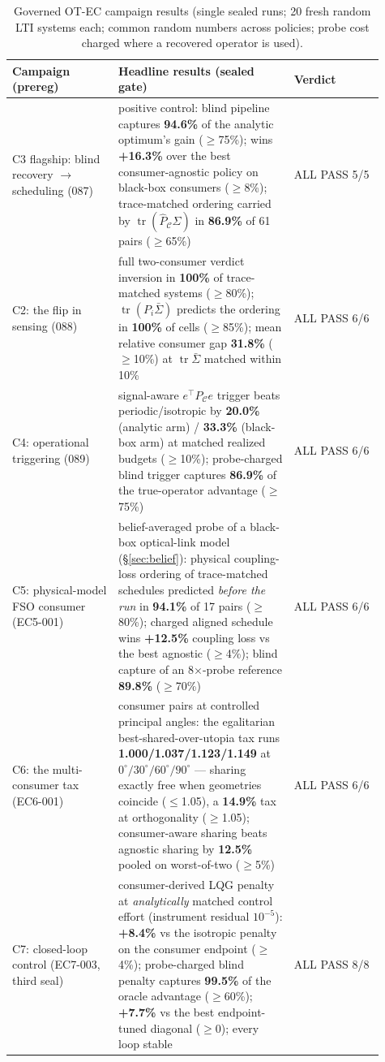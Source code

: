 \documentclass{article}
\theoremstyle{definition}
\theoremstyle{remark}
\newcommand{\PC}{P_{\mathcal{C}}}
\newcommand{\tr}{\operatorname{tr}}
\newcommand{\Sig}{\Sigma}
\begin{document}
\begin{table}[t]
\caption{Governed OT-EC campaign results (single sealed runs; 20 fresh
random LTI systems each; common random numbers across policies; probe cost
charged where a recovered operator is used).}
\label{tab:evidence}
\centering
\begin{tabular}{@{}p{0.26\linewidth}p{0.43\linewidth}p{0.22\linewidth}@{}}
\toprule
\textbf{Campaign (prereg)} & \textbf{Headline results (sealed gate)} & \textbf{Verdict} \\
\midrule
C3 flagship: blind recovery $\to$ scheduling (087) &
positive control: blind pipeline captures \textbf{94.6\%} of the analytic
optimum's gain ($\ge$75\%); wins \textbf{+16.3\%} over the best
consumer-agnostic policy on black-box consumers ($\ge$8\%); trace-matched
ordering carried by $\tr(\widehat\PC\Sig)$ in \textbf{86.9\%} of 61 pairs
($\ge$65\%) & ALL PASS 5/5 \\
\addlinespace
C2: the flip in sensing (088) &
full two-consumer verdict inversion in \textbf{100\%} of trace-matched
systems ($\ge$80\%); $\tr(P_i\bar\Sig)$ predicts the ordering in
\textbf{100\%} of cells ($\ge$85\%); mean relative consumer gap
\textbf{31.8\%} ($\ge$10\%) at $\tr\bar\Sig$ matched within 10\% & ALL PASS 6/6 \\
\addlinespace
C4: operational triggering (089) &
signal-aware $e^{\top}\PC e$ trigger beats periodic/isotropic by
\textbf{20.0\%} (analytic arm) / \textbf{33.3\%} (black-box arm) at matched
realized budgets ($\ge$10\%); probe-charged blind trigger captures
\textbf{86.9\%} of the true-operator advantage ($\ge$75\%) & ALL PASS 6/6 \\
\addlinespace
C5: physical-model FSO consumer (EC5-001) &
belief-averaged probe of a black-box optical-link model
(\S\ref{sec:belief}): physical coupling-loss ordering of trace-matched
schedules predicted \emph{before the run} in \textbf{94.1\%} of 17 pairs
($\ge$80\%); charged aligned schedule wins \textbf{+12.5\%} coupling loss
vs the best agnostic ($\ge$4\%); blind capture of an 8$\times$-probe
reference \textbf{89.8\%} ($\ge$70\%) & ALL PASS 6/6 \\
\addlinespace
C6: the multi-consumer tax (EC6-001) &
consumer pairs at controlled principal angles: the egalitarian
best-shared-over-utopia tax runs \textbf{1.000/1.037/1.123/1.149} at
$0^{\circ}/30^{\circ}/60^{\circ}/90^{\circ}$ --- sharing exactly free when
geometries coincide ($\le$1.05), a \textbf{14.9\%} tax at orthogonality
($\ge$1.05); consumer-aware sharing beats agnostic sharing by
\textbf{12.5\%} pooled on worst-of-two ($\ge$5\%) & ALL PASS 6/6 \\
\addlinespace
C7: closed-loop control (EC7-003, third seal) &
consumer-derived LQG penalty at \emph{analytically} matched control effort
(instrument residual $10^{-5}$): \textbf{+8.4\%} vs the isotropic penalty
on the consumer endpoint ($\ge$4\%); probe-charged blind penalty captures
\textbf{99.5\%} of the oracle advantage ($\ge$60\%); \textbf{+7.7\%} vs
the best endpoint-tuned diagonal ($\ge$0); every loop stable & ALL PASS 8/8 \\
\bottomrule
\end{tabular}
\end{table}
\end{document}
